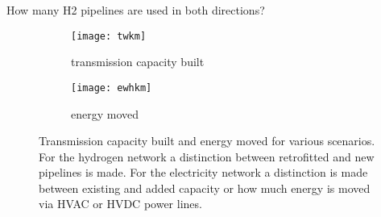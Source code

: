 How many H2 pipelines are used in both directions?

\begin{figure}
    \centering
    \begin{subfigure}[t]{0.49\textwidth}
        \centering
        \caption{transmission capacity built}
        \texttt{[image: twkm]}
        \label{fig:network-stats:twkm}
    \end{subfigure}
    \begin{subfigure}[t]{0.49\textwidth}
        \centering
        \caption{energy moved}
        \texttt{[image: ewhkm]}
        \label{fig:network-stats:ewhkm}
    \end{subfigure}
    \caption{Transmission capacity built and energy moved for various scenarios.
    For the hydrogen network a distinction between retrofitted and new pipelines is made.
    For the electricity network a distinction is made between existing and added capacity
    or how much energy is moved via HVAC or HVDC power lines.}
    \label{fig:network-stats}
\end{figure}

